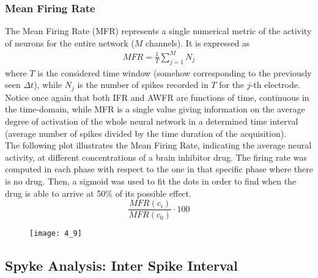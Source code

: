 \subsubsection{Mean Firing Rate}
The Mean Firing Rate (MFR) represents a single numerical metric of the activity of neurons for the entire network (\(M\) channels). It is expressed as
\begin{align*}
    MFR=\frac{1}{T}\sum_{j=1}^{M}N_j
\end{align*}
where \(T\) is the considered time window (somehow corresponding to the previously seen \(\Delta{t}\)), while \(N_j\) is the number of spikes recorded in \(T\) for the \(j\)-th electrode.\\
Notice once again that both IFR and AWFR are functions of time, continuous in the time-domain, while MFR is a single value giving information on the average degree of activation of the whole neural network in a determined time interval (average number of spikes divided by the time duration of the acquisition).\\
The following plot illustrates the Mean Firing Rate, indicating the average neural activity, at
different concentrations of a brain inhibitor drug. The firing rate was computed in each phase with respect to the one in that specific phase where there is no drug. Then, a sigmoid was used to fit the dots in order to find when the drug is able to arrive at 50\(\%\) of its possible effect.
\begin{equation*}
    \frac{MFR(c_i)}{MFR(c_0)}\cdot100
\end{equation*}
\begin{figure}[H]
    \texttt{[image: 4\_9]}
    \centering
\end{figure}
\subsection{Spyke Analysis: Inter Spike Interval}
